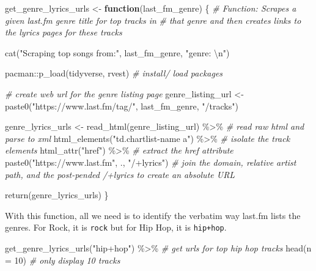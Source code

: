 \documentclass[
]{article}
\newenvironment{Shaded}{\begin{snugshade}}{\end{snugshade}}
\newcommand{\AttributeTok}[1]{\textcolor[rgb]{0.77,0.63,0.00}{#1}}
\newcommand{\CommentTok}[1]{\textcolor[rgb]{0.56,0.35,0.01}{\textit{#1}}}
\newcommand{\ControlFlowTok}[1]{\textcolor[rgb]{0.13,0.29,0.53}{\textbf{#1}}}
\newcommand{\DecValTok}[1]{\textcolor[rgb]{0.00,0.00,0.81}{#1}}
\newcommand{\FunctionTok}[1]{\textcolor[rgb]{0.00,0.00,0.00}{#1}}
\newcommand{\NormalTok}[1]{#1}
\newcommand{\OtherTok}[1]{\textcolor[rgb]{0.56,0.35,0.01}{#1}}
\newcommand{\SpecialCharTok}[1]{\textcolor[rgb]{0.00,0.00,0.00}{#1}}
\newcommand{\StringTok}[1]{\textcolor[rgb]{0.31,0.60,0.02}{#1}}
\begin{document}
\begin{Shaded}
\begin{Highlighting}[]
\NormalTok{get\_genre\_lyrics\_urls }\OtherTok{\textless{}{-}} \ControlFlowTok{function}\NormalTok{(last\_fm\_genre) \{}
  \CommentTok{\# Function: Scrapes a given last.fm genre title for top tracks in}
  \CommentTok{\# that genre and then creates links to the lyrics pages for these tracks}
  
  \FunctionTok{cat}\NormalTok{(}\StringTok{"Scraping top songs from:"}\NormalTok{, last\_fm\_genre, }\StringTok{"genre: }\SpecialCharTok{\textbackslash{}n}\StringTok{"}\NormalTok{)}
  
\NormalTok{  pacman}\SpecialCharTok{::}\FunctionTok{p\_load}\NormalTok{(tidyverse, rvest) }\CommentTok{\# install/ load packages}
  
  \CommentTok{\# create web url for the genre listing page}
\NormalTok{  genre\_listing\_url }\OtherTok{\textless{}{-}} 
    \FunctionTok{paste0}\NormalTok{(}\StringTok{"https://www.last.fm/tag/"}\NormalTok{, last\_fm\_genre, }\StringTok{"/tracks"}\NormalTok{) }
  
\NormalTok{  genre\_lyrics\_urls }\OtherTok{\textless{}{-}} 
    \FunctionTok{read\_html}\NormalTok{(genre\_listing\_url) }\SpecialCharTok{\%\textgreater{}\%} \CommentTok{\# read raw html and parse to xml}
    \FunctionTok{html\_elements}\NormalTok{(}\StringTok{"td.chartlist{-}name a"}\NormalTok{) }\SpecialCharTok{\%\textgreater{}\%} \CommentTok{\# isolate the track elements}
    \FunctionTok{html\_attr}\NormalTok{(}\StringTok{"href"}\NormalTok{) }\SpecialCharTok{\%\textgreater{}\%} \CommentTok{\# extract the href attribute}
    \FunctionTok{paste0}\NormalTok{(}\StringTok{"https://www.last.fm"}\NormalTok{, ., }\StringTok{"/+lyrics"}\NormalTok{) }\CommentTok{\# join the domain, relative artist path, and the post{-}pended /+lyrics to create an absolute URL}
  
  \FunctionTok{return}\NormalTok{(genre\_lyrics\_urls)}
\NormalTok{\}}
\end{Highlighting}
\end{Shaded}

With this function, all we need is to identify the verbatim way last.fm lists the genres. For Rock, it is \texttt{rock} but for Hip Hop, it is \texttt{hip+hop}.

\begin{Shaded}
\begin{Highlighting}[]
\FunctionTok{get\_genre\_lyrics\_urls}\NormalTok{(}\StringTok{"hip+hop"}\NormalTok{) }\SpecialCharTok{\%\textgreater{}\%}  \CommentTok{\# get urls for top hip hop tracks}
  \FunctionTok{head}\NormalTok{(}\AttributeTok{n =} \DecValTok{10}\NormalTok{) }\CommentTok{\# only display 10 tracks}
\end{Highlighting}
\end{Shaded}
\end{document}
